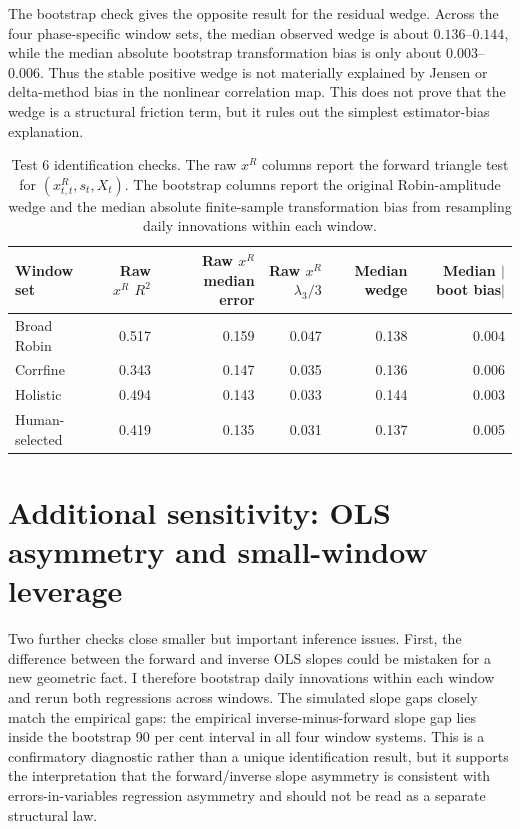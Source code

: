 \documentclass[11pt]{article}
\begin{document}
The bootstrap check gives the opposite result for the residual wedge. Across the four phase-specific window sets, the median observed wedge is about $0.136$--$0.144$, while the median absolute bootstrap transformation bias is only about $0.003$--$0.006$. Thus the stable positive wedge is not materially explained by Jensen or delta-method bias in the nonlinear correlation map. This does not prove that the wedge is a structural friction term, but it rules out the simplest estimator-bias explanation.

\begin{table}[!htbp]
\centering
\scriptsize
\begin{tabular}{lrrrrr}
\toprule
Window set & Raw $x^R$ $R^2$ & Raw $x^R$ median error & Raw $x^R$ $\lambda_3/3$ & Median wedge & Median $|$boot bias$|$ \\
\midrule
Broad Robin & 0.517 & 0.159 & 0.047 & 0.138 & 0.004 \\
Corrfine & 0.343 & 0.147 & 0.035 & 0.136 & 0.006 \\
Holistic & 0.494 & 0.143 & 0.033 & 0.144 & 0.003 \\
Human-selected & 0.419 & 0.135 & 0.031 & 0.137 & 0.005 \\
\bottomrule
\end{tabular}
\caption{Test 6 identification checks. The raw $x^R$ columns report the forward triangle test for $(x^R_{t,t},s_t,X_t)$. The bootstrap columns report the original Robin-amplitude wedge and the median absolute finite-sample transformation bias from resampling daily innovations within each window.}
\label{tab:test6_identification}
\end{table}


\section{Additional sensitivity: OLS asymmetry and small-window leverage}

Two further checks close smaller but important inference issues. First, the difference between the forward and inverse OLS slopes could be mistaken for a new geometric fact. I therefore bootstrap daily innovations within each window and rerun both regressions across windows. The simulated slope gaps closely match the empirical gaps: the empirical inverse-minus-forward slope gap lies inside the bootstrap 90 per cent interval in all four window systems. This is a confirmatory diagnostic rather than a unique identification result, but it supports the interpretation that the forward/inverse slope asymmetry is consistent with errors-in-variables regression asymmetry and should not be read as a separate structural law.
\end{document}
